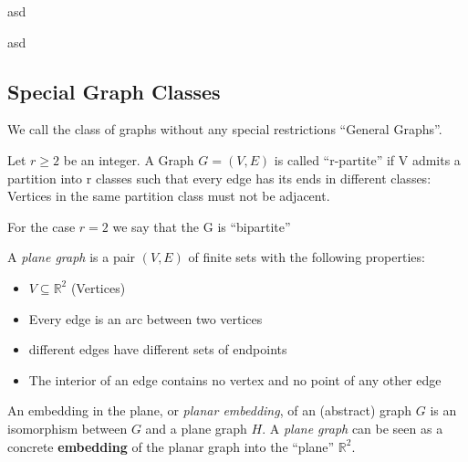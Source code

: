 \begin{definition}
    asd
\end{definition}

\begin{definition}
    asd
\end{definition}

\subsection*{Special Graph Classes}
We call the class of graphs without any special restrictions ``General Graphs''.

\begin{definition}
    Let $r \geq 2$ be an integer. A Graph $G = (V,E)$ is called ``r-partite'' if V admits a partition into r classes such that every edge has its ends in different classes: Vertices in the same partition class must not be adjacent. 
    
    For the case $r = 2$ we say that the G is ``bipartite'' 
    
\end{definition}

\begin{definition}
    
\end{definition}

\begin{definition}
    
\end{definition}

\begin{definition}

A \textit{plane graph} is a pair $(V,E)$ of finite sets with the following properties:

\begin{itemize}
    \item $V \subseteq \mathbb{R}^2$ (Vertices)
    \item Every edge is an arc between two vertices 
    \item different edges have different sets of endpoints
    \item The interior of an edge contains no vertex and no point of any other edge
\end{itemize}

An embedding in the plane, or \textit{planar embedding}, of an (abstract) graph $G$ is an isomorphism between $G$ and a plane graph $H$. A \textit{plane graph} can be seen as a concrete \textbf{embedding} of the planar graph into the ``plane'' $\mathbb{R}^2$.

\end{definition}

